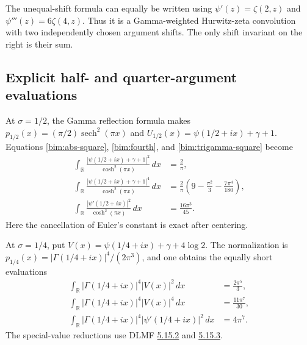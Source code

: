 The unequal-shift formula can equally be written using
$\psi'(z)=\zeta(2,z)$ and $\psi'''(z)=6\zeta(4,z)$.  Thus it is a
Gamma-weighted Hurwitz-zeta convolution with two independently chosen
argument shifts.  The only shift invariant on the right is their sum.

\subsection{Explicit half- and quarter-argument evaluations}

At $\sigma=1/2$, the Gamma reflection formula makes
$p_{1/2}(x)=(\pi/2)\operatorname{sech}^2(\pi x)$ and
$U_{1/2}(x)=\psi(1/2+ix)+\gamma+1$.  Equations
\eqref{bim:abs-square}, \eqref{bim:fourth}, and
\eqref{bim:trigamma-square} become
\begin{align}
 \int_{\mathbb R}\frac{|\psi(1/2+ix)+\gamma+1|^2}
                            {\cosh^2(\pi x)}\,dx
                   &=\frac2\pi,\label{bim:half-square}\\
 \int_{\mathbb R}\frac{|\psi(1/2+ix)+\gamma+1|^4}
                            {\cosh^2(\pi x)}\,dx
                   &=\frac2\pi\left(9-\frac{\pi^2}{3}
                                          -\frac{7\pi^4}{180}\right),
                                               \label{bim:half-fourth}\\
 \int_{\mathbb R}\frac{|\psi'(1/2+ix)|^2}
                            {\cosh^2(\pi x)}\,dx
                   &=\frac{16\pi^3}{45}.\label{bim:half-trigamma}
\end{align}
Here the cancellation of Euler's constant is exact after centering.

At $\sigma=1/4$, put $V(x)=\psi(1/4+ix)+\gamma+4\log2$.
The normalization is $p_{1/4}(x)=|\Gamma(1/4+ix)|^4/(2\pi^3)$, and
one obtains the equally short evaluations
\begin{align}
 \int_{\mathbb R}|\Gamma(1/4+ix)|^4|V(x)|^2\,dx&=\frac{2\pi^5}{3},
                                                   \label{bim:quarter-square}\\
 \int_{\mathbb R}|\Gamma(1/4+ix)|^4|V(x)|^4\,dx&=\frac{11\pi^7}{30},
                                                   \label{bim:quarter-fourth}\\
 \int_{\mathbb R}|\Gamma(1/4+ix)|^4|\psi'(1/4+ix)|^2\,dx&=4\pi^7.
                                                   \label{bim:quarter-trigamma}
\end{align}
The special-value reductions use DLMF
\href{https://dlmf.nist.gov/5.15.E2}{5.15.2} and
\href{https://dlmf.nist.gov/5.15.E3}{5.15.3}.

